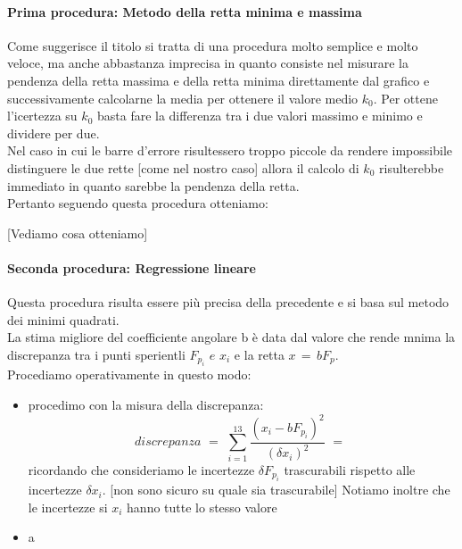 \paragraph{Prima procedura: Metodo della retta minima e massima\\}
Come suggerisce il titolo si tratta di una procedura molto semplice e molto veloce, ma anche abbastanza imprecisa in quanto consiste nel misurare la pendenza della retta massima e della retta minima direttamente dal grafico e successivamente calcolarne la media per ottenere il valore medio $k_0$. Per ottene l'icertezza su $k_0$ basta fare la differenza tra i due valori massimo e minimo e dividere per due.\\
Nel caso in cui le barre d'errore risultessero troppo piccole da rendere impossibile distinguere le due rette [come nel nostro caso] allora il calcolo di $k_0$ risulterebbe immediato in quanto sarebbe la pendenza della retta.\\
Pertanto seguendo questa procedura otteniamo:

[Vediamo cosa otteniamo]

\paragraph{Seconda procedura: Regressione lineare\\}
Questa procedura risulta essere più precisa della precedente e si basa sul metodo dei minimi quadrati.\\
La stima migliore del coefficiente angolare b è data dal valore che rende mnima la discrepanza tra i punti sperientli $F_{p_i} \,\,e\,\, x_i$ e la retta $x \,=\, bF_p$.\\
Procediamo operativamente in questo modo:
\begin{itemize}
	\item{procedimo con la misura della discrepanza:
			\begin{equation*}
				discrepanza \,\,=\,\, \sum_{i=1}^{13} \frac{(x_i - bF_{p_i})^2}{(\delta x_i)^2} \,\,=\,\,		
			\end{equation*}
			ricordando che consideriamo le incertezze $\delta F_{p_i}$ trascurabili rispetto alle incertezze $\delta x_i$. [non sono sicuro su quale sia trascurabile] Notiamo inoltre che le incertezze si $x_i$ hanno tutte lo stesso valore}
	\item{a}
\end{itemize}


